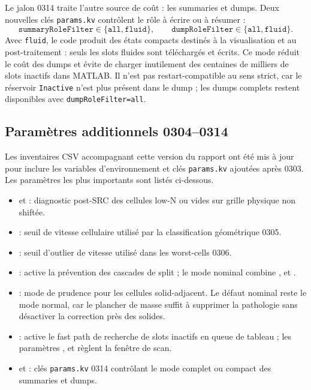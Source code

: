 \documentclass[11pt,a4paper]{article}
\begin{document}
Le jalon 0314 traite l'autre source de coût : les summaries et dumps. Deux nouvelles clés \texttt{params.kv} contrôlent le rôle à écrire ou à résumer :
\begin{equation}
  \texttt{summaryRoleFilter} \in \{\texttt{all},\texttt{fluid}\}, \qquad
  \texttt{dumpRoleFilter} \in \{\texttt{all},\texttt{fluid}\}.
\end{equation}
Avec \texttt{fluid}, le code produit des états compacts destinés à la visualisation et au post-traitement : seuls les slots fluides sont téléchargés et écrits. Ce mode réduit le coût des dumps et évite de charger inutilement des centaines de milliers de slots inactifs dans MATLAB. Il n'est pas restart-compatible au sens strict, car le réservoir \texttt{Inactive} n'est plus présent dans le dump ; les dumps complets restent disponibles avec \texttt{dumpRoleFilter=all}.

\subsection{Paramètres additionnels 0304--0314}

Les inventaires CSV accompagnant cette version du rapport ont été mis à jour pour inclure les variables d'environnement et clés \texttt{params.kv} ajoutées après 0303. Les paramètres les plus importants sont listés ci-dessous.

\begin{itemize}[nosep]
  \item {} et  : diagnostic post-SRC des cellules low-N ou vides sur grille physique non shiftée.
  \item {} : seuil de vitesse cellulaire utilisé par la classification géométrique 0305.
  \item {} : seuil d'outlier de vitesse utilisé dans les worst-cells 0306.
  \item {} : active la prévention des cascades de split ; le mode nominal combine ,  et .
  \item {} : mode de prudence pour les cellules solid-adjacent. Le défaut nominal reste le mode normal, car le plancher de masse suffit à supprimer la pathologie sans désactiver la correction près des solides.
  \item {} : active le fast path de recherche de slots inactifs en queue de tableau ; les paramètres ,  et  règlent la fenêtre de scan.
  \item {} et  : clés \texttt{params.kv} 0314 contrôlant le mode complet ou compact des summaries et dumps.
\end{itemize}
\end{document}
